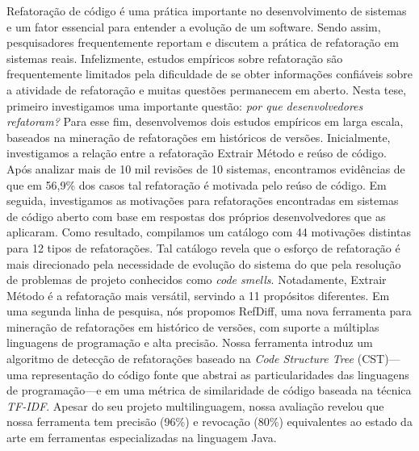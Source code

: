 
Refatoração de código é uma prática importante no desenvolvimento de sistemas e um fator essencial para entender a evolução de um software.
Sendo assim, pesquisadores frequentemente reportam e discutem a prática de refatoração em sistemas reais.
Infelizmente, estudos empíricos sobre refatoração são frequentemente limitados pela dificuldade de se obter informações confiáveis sobre a atividade de refatoração e muitas questões permanecem em aberto.
Nesta tese, primeiro investigamos uma importante questão: \emph{por que desenvolvedores refatoram?}
Para esse fim, desenvolvemos dois estudos empíricos em larga escala, baseados na mineração de refatorações em históricos de versões.
Inicialmente, investigamos a relação entre a refatoração Extrair Método e reúso de código.
Após analizar mais de 10 mil revisões de 10 sistemas, encontramos evidências de que em 56,9\% dos casos tal refatoração é motivada pelo reúso de código.
Em seguida, investigamos as motivações para refatorações encontradas em sistemas de código aberto com base em respostas dos próprios desenvolvedores que as aplicaram.
Como resultado, compilamos um catálogo com 44 motivações distintas para 12 tipos de refatorações.
Tal catálogo revela que o esforço de refatoração é mais direcionado pela necessidade de evolução do sistema do que pela resolução de problemas de projeto conhecidos como \emph{code smells}.
Notadamente, Extrair Método é a refatoração mais versátil, servindo a 11 propósitos diferentes.
Em uma segunda linha de pesquisa, nós propomos RefDiff, uma nova ferramenta para mineração de refatorações em histórico de versões, com suporte a múltiplas linguagens de programação e alta precisão.
Nossa ferramenta introduz um algoritmo de detecção de refatorações baseado na \emph{Code Structure Tree} (CST)---uma representação do código fonte que abstrai as particularidades das linguagens de programação---e em uma métrica de similaridade de código baseada na técnica \emph{TF-IDF}.
Apesar do seu projeto multilinguagem, nossa avaliação revelou que nossa ferramenta tem precisão (96\%) e revocação (80\%) equivalentes ao estado da arte em ferramentas especializadas na linguagem Java.

